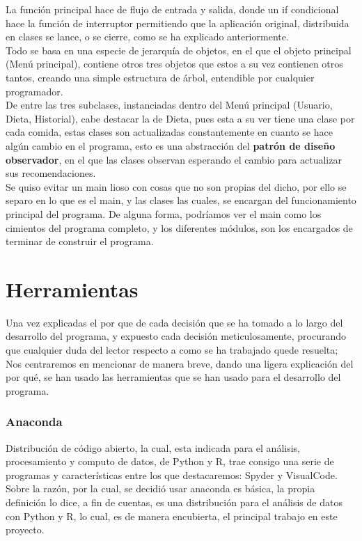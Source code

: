 La función principal hace de flujo de entrada y salida, donde un if condicional hace la función de interruptor permitiendo que la aplicación original, distribuida en clases se lance, o se cierre, como se ha explicado anteriormente.\\

Todo se basa en una especie de jerarquía de objetos, en el que el objeto principal (Menú principal), contiene otros tres objetos que estos a su vez contienen otros tantos, creando una simple estructura de árbol, entendible por cualquier programador. \\

De entre las tres subclases, instanciadas dentro del Menú principal (Usuario, Dieta, Historial), cabe destacar la de Dieta, pues esta a su ver tiene una clase por cada comida, estas clases son actualizadas constantemente en cuanto se hace algún cambio en el programa, esto es una abstracción del \textbf{ patrón de diseño observador}, en el que las clases observan esperando el cambio para actualizar sus recomendaciones.\\

Se quiso evitar un main lioso con cosas que no son propias del dicho, por ello se separo en lo que es el main, y las clases las cuales, se encargan del funcionamiento principal del programa. De alguna forma, podríamos ver el main como los cimientos del programa completo, y los diferentes módulos, son los encargados de terminar de construir el programa.
\section{Herramientas}
Una vez explicadas el por que de cada decisión que se ha tomado a lo largo del desarrollo del programa, y expuesto cada decisión meticulosamente, procurando que cualquier duda del lector respecto a como se ha trabajado quede resuelta; Nos centraremos en mencionar de manera breve, dando una ligera explicación del por qué, se han usado las herramientas que se han usado para el desarrollo del programa.
\subsubsection{Anaconda}
Distribución de código abierto, la cual, esta indicada para el análisis, procesamiento y computo de datos, de Python y R, trae consigo una serie de programas y características entre los que destacaremos: Spyder y VisualCode.\\

Sobre la razón, por la cual, se decidió usar anaconda es básica, la propia definición lo dice, a fin de cuentas, es una distribución para el análisis de datos con Python y R, lo cual, es de manera encubierta, el principal trabajo en este proyecto.
